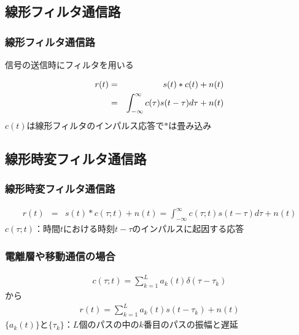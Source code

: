 \documentclass[dvipdfmx]{beamer}  %
\begin{document}
\subsection{線形フィルタ通信路}
\begin{frame}
	\frametitle{線形フィルタ通信路}
	信号の送信時にフィルタを用いる
	\begin{center}
	\end{center}
	\begin{eqnarray*}
		r(t) &=& s(t)\ast c(t) + n(t) \cr
		& = & \int_{-\infty}^{\infty} c(\tau)s(t-\tau)d\tau + n(t)
		\label{Eq:1-3-2}
	\end{eqnarray*}
	$c(t)$は線形フィルタのインパルス応答で$\ast$は畳み込み
\end{frame}

\subsection{線形時変フィルタ通信路}
\begin{frame}
	\frametitle{線形時変フィルタ通信路}
	\begin{center}
	\end{center}
	\begin{eqnarray*}
		r(t) &=& s(t)\ast c(\tau;t) + n(t) =\int_{-\infty}^{\infty} c(\tau;t)s(t-\tau)d\tau + n(t)
	\end{eqnarray*}
	$c(\tau; t)$：時間$t$における時刻$t-\tau$のインパルスに起因する応答
\end{frame}
\begin{frame}
	
	\frametitle{電離層や移動通信の場合}
	\begin{eqnarray*}
		c(\tau;t) = \sum_{k=1}^{L}a_k(t)\delta(\tau-\tau_k)
	\end{eqnarray*}
	から
	\begin{eqnarray*}
		r(t) = \sum_{k=1}^{L}a_k(t)s(t-\tau_k) +n(t)
	\end{eqnarray*}
	$\{a_k(t)\}$と$\{\tau_k\}$：$L$個のパスの中の$k$番目のパスの振幅と遅延
\end{frame}
\end{document}
